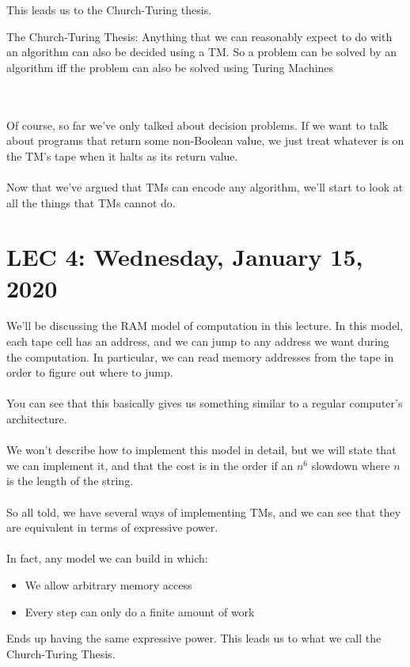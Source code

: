 \documentclass[12pt]{article}
\begin{document}
This leads us to the Church-Turing thesis.

\begin{tcolorbox}
 The Church-Turing Thesis: Anything that we can reasonably expect to do with an algorithm can also be decided using a TM. So a problem can be solved by an algorithm iff the problem can also be solved using Turing Machines
\end{tcolorbox}
\\
\\
Of course, so far we've only talked about decision problems. If we want to talk about programs that return some non-Boolean value, we just treat whatever is on the TM's tape when it halts as its return value.
\\
\\
Now that we've argued that TMs can encode any algorithm, we'll start to look at all the things that TMs cannot do.

\section{LEC 4: Wednesday, January 15, 2020}

We'll be discussing the RAM model of computation in this lecture. In this model, each tape cell has an address, and we can jump to any address we want during the computation. In particular, we can read memory addresses from the tape in order to figure out where to jump.
\\
\\
You can see that this basically gives us something similar to a regular computer's architecture.
\\
\\
We won't describe how to implement this model in detail, but we will state that we can implement it, and that the cost is in the order if an $n^6$ slowdown where $n$ is the length of the string.
\\
\\
So all told, we have several ways of implementing TMs, and we can see that they are equivalent in terms of expressive power.
\\
\\
In fact, any model we can build in which:
\begin{itemize}
    \item We allow arbitrary memory access
    \item Every step can only do a finite amount of work
\end{itemize}
Ends up having the same expressive power. This leads us to what we call the Church-Turing Thesis.
\\
\\
\end{document}
